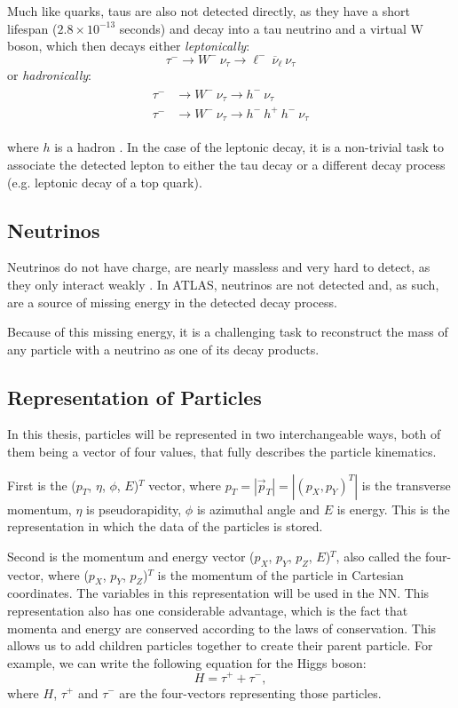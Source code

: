 \documentclass{ctuthesis}
\begin{document}
Much like quarks, taus are also not detected directly, as they have a short lifespan ($2.8\times 10^{-13}$ seconds) and decay into a tau neutrino and a virtual W boson, which then decays either \emph{leptonically}:
\begin{equation}\tau^{-} \rightarrow W^{-}\: \nu_{\tau} \rightarrow \ell^{-} \:\overline{\nu}_{\ell}\: \nu_{\tau}
\end{equation}
or \emph{hadronically}:
\begin{align}
\begin{split}
    \tau^{-} &\rightarrow W^{-}\: \nu_{\tau} \rightarrow h^{-} \:\nu_{\tau} \\
    \tau^{-} &\rightarrow W^{-}\: \nu_{\tau} \rightarrow h^{-}\:h^{+}\:h^{-} \:\nu_{\tau}
\end{split}
\end{align}

where $h$ is a hadron \cite{taus_1}\cite{taus_2}. In the case of the leptonic decay, it is a non-trivial task to associate the detected lepton to either the tau decay or a different decay process (e.g. leptonic decay of a top quark).

\subsection{Neutrinos}
Neutrinos do not have charge, are nearly massless and very hard to detect, as they only interact weakly \cite{neutrinos}. In ATLAS, neutrinos are not detected and, as such, are a source of missing energy in the detected decay process.

Because of this missing energy, it is a challenging task to reconstruct the mass of any particle with a neutrino as one of its decay products.

\subsection{Representation of Particles}
\label{particles_representation}
In this thesis, particles will be represented in two interchangeable ways, both of them being a vector of four values, that fully describes the particle kinematics.

First is the ($p_T$, $\eta$, $\phi$, $E$)$^T$ vector, where $p_T = |\vec{p}_T| = |(p_X, p_Y)^T|$ is the transverse momentum, $\eta$ is pseudorapidity, $\phi$ is azimuthal angle and $E$ is energy. This is the representation in which the data of the particles is stored.

Second is the momentum and energy vector ($p_X$, $p_Y$, $p_Z$, $E$)$^T$, also called the four-vector, where ($p_X$, $p_Y$, $p_Z$)$^T$ is the momentum of the particle in Cartesian coordinates. The variables in this representation will be used in the NN. This representation also has one considerable advantage, which is the fact that momenta and energy are conserved according to the laws of conservation. This allows us to add children particles together to create their parent particle. For example, we can write the following equation for the Higgs boson:
\begin{equation}
H = \tau^+ + \tau^-,
\end{equation}
where $H$, $\tau^+$ and $\tau^-$ are the four-vectors representing those particles.
\end{document}
